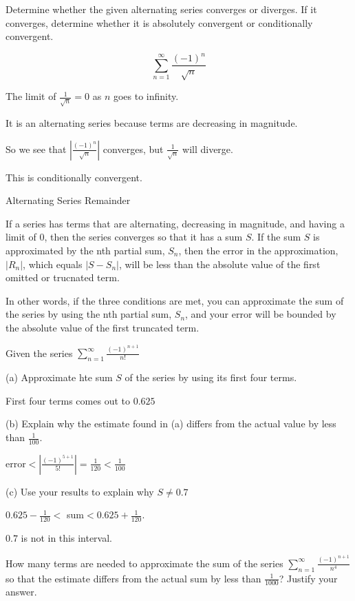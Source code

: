 \documentclass[../bccalc.tex]{subfiles}
\begin{document}
\begin{example}
    Determine whether the given alternating series converges or diverges. If it converges, determine whether it is absolutely convergent or conditionally convergent.

    \[ \sum_{n=1}^{\infty}\frac{(-1)^n}{\sqrt{n}} \]

    The limit of $\frac{1}{\sqrt{n}}=0$ as $n$ goes to infinity.

    It is an alternating series because terms are decreasing in magnitude.

    So we see that $\left| \frac{(-1)^n}{\sqrt{n}}\right|$ converges, but $\frac{1}{\sqrt{n}}$ will diverge.

    This is conditionally convergent.
\end{example}

Alternating Series Remainder 

If a series has terms that are alternating, decreasing in magnitude, and having a limit of 0, then the series converges so that it has a sum $S$. If the sum $S$ is approximated by the nth partial sum, $S_n$, then the error in the approximation, $|R_n|$, which equals $|S-S_n|$, will be less than the absolute value of the first omitted or trucnated term.

In other words, if the three conditions are met, you can approximate the sum of the series by using the nth partial sum, $S_n$, and your error will be bounded by the absolute value of the first truncated term.
\pagebreak
\begin{example}
    Given the series $\sum_{n=1}^{\infty} \frac{(-1)^{n+1}}{n!}$

    (a) Approximate hte sum $S$ of the series by using its first four terms.

    First four terms comes out to $0.625$

    (b) Explain why the estimate found in (a) differs from the actual value by less than $\frac{1}{100}$.

    error$<\left|\frac{(-1)^{5+1}}{5!}\right| = \frac{1}{120}<\frac{1}{100}$

    (c) Use your results to explain why $S\neq 0.7$

    $0.625-\frac{1}{120} < $ sum$<0.625+\frac{1}{120}$.

    $0.7$ is not in this interval.
\end{example}

\ex How many terms are needed to approximate the sum of the series $\sum_{n=1}^{\infty}\frac{(-1)^{n+1}}{n^4}$ so that the estimate differs from the actual sum by less than $\frac{1}{1000}$? Justify your answer.
\end{document}
